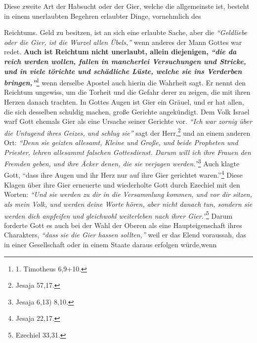 Diese zweite Art der Habsucht oder der Gier, welche die allgemeinste ist,
besteht in einem unerlaubten Begehren erlaubter Dinge, vornehmlich des

 Reichtums. Geld zu besitzen, ist an sich eine erlaubte Sache, aber die
\textit{"`Geldliebe oder die Gier, ist die Wurzel allen Übels,"'} wenn anderes
der Mann
Gottes war redet. \label{ref:13_05_reichtum} \textbf{Auch ist
Reichtum nicht unerlaubt, allein diejenigen,
\textit{"`die da reich werden wollen, fallen in mancherlei Versuchungen und
Stricke, und in
viele törichte und schädliche Lüste, welche sie ins Verderben
bringen,"'}}\footnote{1. Timotheus 6,9+10.}
wenn derselbe Apostel auch hierin die
Wahrheit sagt. Er nennt den Reichtum ungewiss, um die Torheit und die Gefahr
derer zu zeigen, die mit ihren Herzen danach trachten. In Gottes Augen ist
Gier ein Gräuel, und er hat allen, die sich desselben schuldig machen, große
Gerichte angekündigt. Dem Volk
Israel warf Gott ehemals Gier als eine
Ursache seiner Gerichte vor.
\textit{"`Ich war zornig über die Untugend ihres Geizes,
und schlug sie"'} sagt der Herr,\footnote{Jesaja 57,17.}
und an einem anderen Ort:
\textit{"`Denn sie geizten
 allesamt, Kleine und Große, und beide Propheten und
Priester, lehren allesammt falschen Gottesdienst. Darum will ich ihre Frauen den
Fremden geben, und ihre Äcker denen, die sie verjagen werden."'}\footnote{Jesaja 6,13) 8,10.}
Auch klagte Gott,
"`dass ihre Augen und ihr Herz nur auf ihre Gier
gerichtet waren."'\footnote{Jesaja 22,17.}
Diese Klagen über ihre Gier erneuerte
und wiederholte Gott durch Ezechiel mit den Worten:
\textit{"`Und sie werden zu dir
in die Versammlung kommen, und vor dir sitzen, als mein Volk, und werden deine
Worte hören, aber nicht danach tun, sondern sie werden dich anpfeifen und
gleichwohl weiterleben nach ihrer Gier."'}\footnote{Ezechiel 33,31.}
Darum forderte
Gott es auch bei der Wahl der Oberen als eine Haupteigenschaft ihres Charakters,
\textit{"`dass sie die Gier hassen sollten,"'} weil er das Elend voraussah, das
in einer
Gesellschaft oder in einem Staate daraus erfolgen würde,wenn
